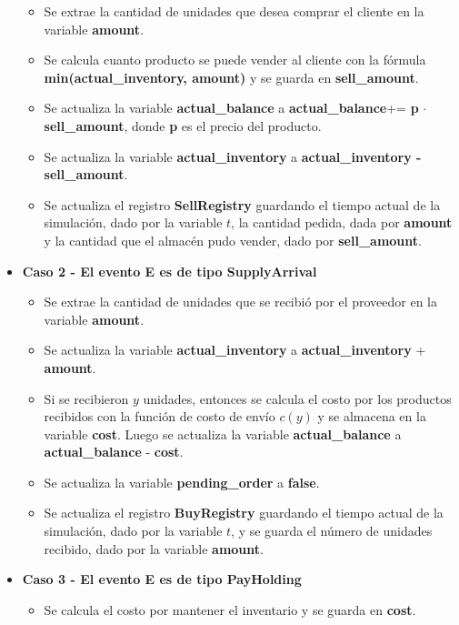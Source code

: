 \documentclass{article}
\begin{document}
\begin{itemize}
    \begin{itemize}
        \item Se extrae la cantidad de unidades que desea comprar el cliente en la variable \textbf{amount}.
        \item Se calcula cuanto producto se puede vender al cliente con la fórmula \textbf{min(actual\_inventory, amount)} y se guarda en \textbf{sell\_amount}.
        \item Se actualiza la variable \textbf{actual\_balance} a \textbf{actual\_balance}+= \textbf{p} $\cdot$ \textbf{sell\_amount}, donde \textbf{p} es el precio del producto.
        \item Se actualiza la variable \textbf{actual\_inventory} a \textbf{actual\_inventory - sell\_amount}.
        \item Se actualiza el registro \textbf{SellRegistry} guardando el tiempo actual de la simulación, dado por la variable $t$, la cantidad pedida, dada por \textbf{amount} y la cantidad que el almacén pudo vender, dado por \textbf{sell\_amount}.
    \end{itemize}
    \item \textbf{Caso 2 - El evento E es de tipo SupplyArrival}
    \begin{itemize}
        \item Se extrae la cantidad de unidades que se recibió por el proveedor en la variable \textbf{amount}.
        \item Se actualiza la variable \textbf{actual\_inventory} a \textbf{actual\_inventory} + \textbf{amount}.
        \item Si se recibieron $y$ unidades, entonces se calcula el costo por los productos recibidos con la función de costo de envío $c(y)$ y se almacena en la variable \textbf{cost}. Luego se actualiza la variable \textbf{actual\_balance} a \textbf{actual\_balance} - \textbf{cost}.
        \item Se actualiza la variable \textbf{pending\_order} a \textbf{false}.
        \item Se actualiza el registro \textbf{BuyRegistry} guardando el tiempo actual de la simulación, dado por la variable $t$, y se guarda el número de unidades recibido, dado por la variable \textbf{amount}.
    \end{itemize}
    \item \textbf{Caso 3 - El evento E es de tipo PayHolding}
    \begin{itemize}
        \item Se calcula el costo por mantener el inventario y se guarda en \textbf{cost}.

\end{itemize}
\end{itemize}
\end{document}
